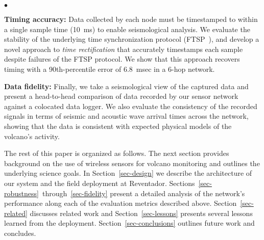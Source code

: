 \begin{list}{$\bullet$}{\setlength{\topsep}{0.05in}
                        \setlength{\leftmargin}{0.15in}
                        \setlength{\itemsep}{0.05in}}
%
\item 
{\bf Timing accuracy:} Data collected by each node
must be timestamped to within a single sample time (10~ms) to
enable seismological analysis. We evaluate the
stability of the underlying time synchronization protocol 
(FTSP~\cite{ftsp}), and develop a novel approach to {\em time 
rectification} that accurately timestamps each sample despite
failures of the FTSP protocol. We show that this approach
recovers timing with a 90th-percentile error of 6.8~msec in a 6-hop network.
%
%
\item 
{\bf Data fidelity:} Finally, we take a seismological view of
the captured data and present a head-to-head comparison of data 
recorded by our sensor network against a colocated data logger.  
We also evaluate the consistency of the recorded signals in terms 
of seismic and acoustic wave arrival times across the network, 
showing that the data is consistent with expected physical models 
of the volcano's activity.
%
\end{list}

The rest of this paper is organized as follows. The next section
provides background on the use of wireless sensors for volcano
monitoring and outlines the underlying science goals. In 
Section~\ref{sec-design} we describe the architecture of our 
system and the field deployment at Reventador.
Sections~\ref{sec-robustness}~through~\ref{sec-fidelity} present
a detailed analysis of the network's performance along each of the
evaluation metrics described above. Section~\ref{sec-related} 
discusses related work and Section~\ref{sec-lessons} presents several
lessons learned from the deployment. Section~\ref{sec-conclusions} 
outlines future work and concludes.

